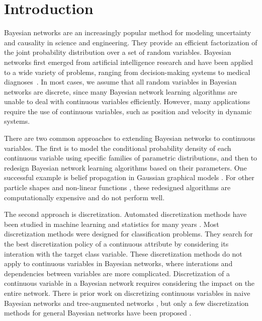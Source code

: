 \section{Introduction}
\label{intro}
Bayesian networks \citep{Pearl_1988, PGM_2009} are an increasingly popular method for modeling uncertainty and causality in science and engineering. They provide an efficient factorization of the joint probability distribution over a set of random variables. Bayesian networks first emerged from artificial intelligence research and have been applied to a wide variety of problems, ranging from decision-making systems \citep{DMU_2015} to medical diagnoses~\todo{[cite]}. In most cases, we assume that all random variables in Bayesian networks are discrete, since many Bayesian network learning algorithms are unable to deal with continuous variables efficiently. However, many applications
require the use of continuous variables, such as position and velocity in dynamic systems.

There are two common approaches to extending Bayesian networks to continuous variables. The first is to model the conditional probability density of each continuous variable using specific families of parametric distributions, and then to redesign Bayesian network learning algorithms based on their parameters. One successful example is belief propagation in Gaussian graphical models \citep{Weiss_2011}. For other particle shapes \citep{Ihler_2009} and non-linear functions , these redesigned algorithms are computationally expensive and do not perform well.

The second approach is discretization. Automated discretization methods have been studied in machine learning and statistics for many years \citep{Dougherty_1995, Kerber_1992, Holte_1993, Fayyad_1993}. Most discretization methods were designed for classification problems. They search for the best discretization policy of a continuous attribute by considering its interation with the target class variable. These discretization methods do not apply to continuous variables in Bayesian networks, where interations and dependencies between variables are more complicated. Discretization of a continuous variable in a Bayesian network requires considering the impact on the entire network. There is prior work on discretizing continuous variables in naive Bayesian networks and tree-augmented networks \citep{Fried_naive}, but only a few discretization methods for general Bayesian networks have been proposed \citep{Friedman_1996, Kozlov_1997, Monti_1998, Steck_2007}.

